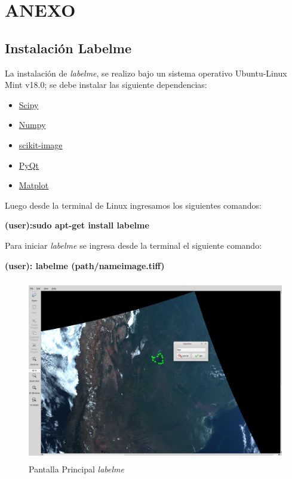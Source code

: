 \chapter{ANEXO}\label{chap:anexo}
\section{Instalación Labelme}\label{sec:instalacionlabelme}
La instalación de \textit{labelme}, se realizo bajo un sistema operativo Ubuntu-Linux Mint v18.0; se debe instalar las siguiente dependencias:
\begin{itemize}
\item \href{https://www.scipy.org/}{Scipy}
\item \href{http://www.numpy.org/}{Numpy}
\item \href{http://scikit-image.org/}{scikit-image}
\item \href{https://riverbankcomputing.com/software/pyqt/intro}{PyQt}
\item \href{http://matplotlib.org/}{Matplot}
\end{itemize}

Luego desde la terminal de Linux ingresamos los siguientes comandos:

\textbf{(user):sudo apt-get install labelme}

Para iniciar \textit{labelme} se ingresa desde la terminal el siguiente comando:

\textbf{(user): labelme (path/nameimage.tiff)}

\begin{figure}[H]
 \centering
  \includegraphics[height=8cm,keepaspectratio=true,clip=true]{imagenes/Apendice/labelme1.png}
  \caption{Pantalla Principal \textit{labelme}}
	\label{Fig: labelme}
\end{figure}

